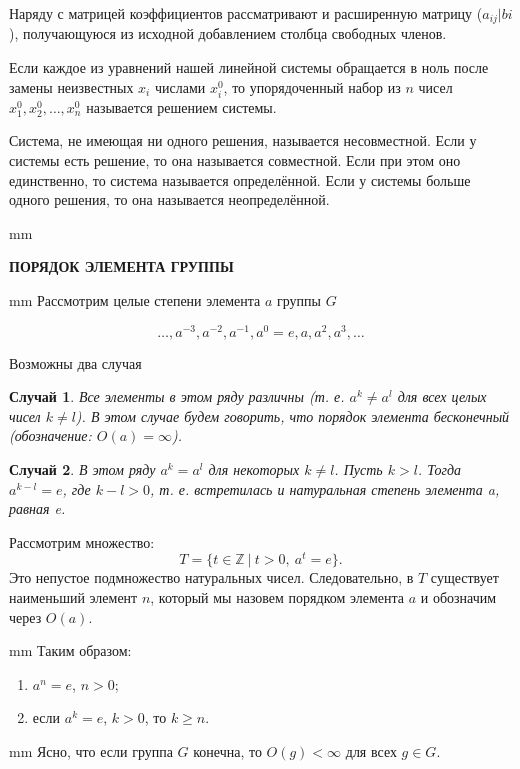 \documentclass[12pt,english,russian]{article}
\newtheorem{sluch}{Случай}
\begin{document}
	Наряду с матрицей коэффициентов рассматривают и
	расширенную матрицу
	($a_{ij}|bi$), получающуюся из исходной добавлением столбца свободных членов.

	Если каждое из уравнений нашей линейной системы обращается в ноль после замены неизвестных 
	$x_i$ числами
	$x_i^0$, то упорядоченный набор из $n$ чисел
	$x_1^0, x_2^0, \dots , x_n^0$ называется решением
	системы. 

	Система, не имеющая ни одного решения, называется
	несовместной. Если у системы есть решение, то она называется
	совместной. Если при этом оно единственно, то система называется
	определённой. Если у системы больше одного решения, то она называется
	неопределённой.
	
	 mm
	\begin{center}
		{\large {\bf ПОРЯДОК ЭЛЕМЕНТА ГРУППЫ}}
	\end{center}
	
	 mm
	Рассмотрим целые степени элемента $a$ группы $G$
	
	$$\dots ,a^{-3},a^{-2},a^{-1},a^0 = e,a,a^2,a^3,\dots$$
	
	Возможны два случая
	\begin{sluch}
		Все элементы в этом ряду различны (т. е. $a^k \ne a^l$ для 
		всех целых чисел $k\ne l$). В этом случае будем говорить, 
		что порядок элемента бесконечный (обозначение: $O(a) = \infty$).
	\end{sluch}
	
	\begin{sluch}
		В этом ряду $a^k = a^l$ для некоторых $k \ne l$. Пусть $k > l$. 
		Тогда $a^{k-l}=e$, где $k-l > 0$, т. е. встретилась и натуральная 
		степень элемента a, равная e. 
	\end{sluch}
	Рассмотрим множество:
	\begin{equation}
		T = \{t \in \mathbb{Z} \ | \ t>0, \ a^t = e\}.
	\end{equation}
	Это непустое подмножество натуральных чисел. Следовательно, в
	$T$ существует наименьший элемент $n$, который мы назовем порядком элемента $a$
	и обозначим через $O(a)$.
	
		 mm
	Таким образом:
	\begin{enumerate}
		\item $a^n=e$, $n>0$;
		\item если $a^k=e$, $k>0$, то $k\geqslant n$.
	\end{enumerate}
	
	 mm
	Ясно, что если группа $G$ конечна, то $O(g) < \infty$ для 
	всех $g\in G$.
	
\end{document}
